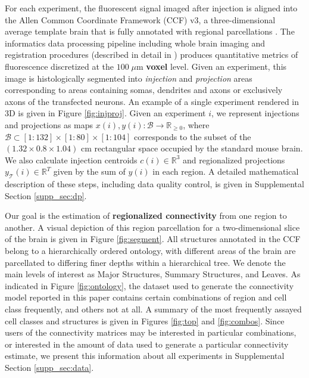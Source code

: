 For each experiment, the fluorescent signal imaged after injection is aligned into the Allen Common Coordinate Framework (CCF) v3, a three-dimensional average template brain that is fully annotated with regional parcellations \cite{Wang2020-po}.
The informatics data processing pipeline including whole brain imaging and registration procedures (described in detail in \citep{Oh2014-kh, Kuan2015-zz}) produces quantitative metrics of fluorescence discretized at the $100 \; \mu$m \textbf{voxel} level. 
Given an experiment, this image is histologically segmented into \textit{injection} and \textit{projection} areas corresponding to areas containing somas, dendrites and axons or exclusively axons of the transfected neurons.
An example of a single experiment rendered in 3D is given in Figure \ref{fig:injproj}.
Given an experiment $i$, we represent injections and projections as maps $x(i),y(i) : \mathcal B \to \mathbb R_{\geq 0}$, where $\mathcal B \subset [1:132] \times [1:80] \times [1:104]$ corresponds to the subset of the $(1.32 \times 0.8 \times 1.04)$ cm rectangular space occupied by the standard mouse brain.
We also calculate injection centroids $c(i) \in \mathbb R^3$ and regionalized projections $y_{\mathcal T} (i) \in \mathbb R^{T} $ given by the sum of $y(i)$ in each region.
A detailed mathematical description of these steps, including data quality control, is given in Supplemental Section \ref{supp_sec:dp}.

Our goal is the estimation of \textbf{regionalized connectivity} from one region to another.
A visual depiction of this region parcellation for a two-dimensional slice of the brain is given in Figure \ref{fig:segment}.
All structures annotated in the CCF belong to a hierarchically ordered ontology, with different areas of the brain are parcellated to differing finer depths within a hierarchical tree.
We denote the main levels of interest as Major Structures, Summary Structures, and Leaves.
As indicated in Figure \ref{fig:ontology}, the dataset used to generate the connectivity model reported in this paper contains certain combinations of region and cell class frequently, and others not at all.
A summary of the most frequently assayed cell classes and structures is given in Figures \ref{fig:top} and \ref{fig:combos}.
Since users of the connectivity matrices may be interested in particular combinations, or interested in the amount of data used to generate a particular connectivity estimate, we present this information about all experiments in Supplemental Section \ref*{supp_sec:data}.

